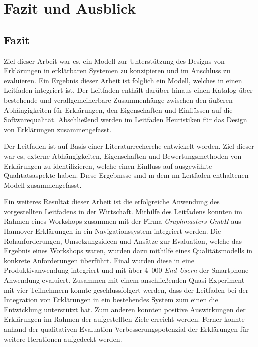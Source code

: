 \chapter{Fazit und Ausblick}

\section{Fazit}

Ziel dieser Arbeit war es, ein Modell zur Unterstützung des Designs von Erklärungen in erklärbaren Systemen zu konzipieren und im Anschluss zu evaluieren. Ein Ergebnis dieser Arbeit ist folglich ein Modell, welches in einen Leitfaden integriert ist. Der Leitfaden enthält darüber hinaus einen Katalog über bestehende und verallgemeinerbare Zusammenhänge zwischen den äußeren Abhängigkeiten für Erklärungen, den Eigenschaften und Einflüssen auf die Softwarequalität. Abschließend werden im Leitfaden Heuristiken für das Design von Erklärungen zusammengefasst.

Der Leitfaden ist auf Basis einer Literaturrecherche entwickelt worden. Ziel dieser war es, externe Abhängigkeiten, Eigenschaften und Bewertungsmethoden von Erklärungen zu identifizieren, welche einen Einfluss auf ausgewählte Qualitätsaspekte haben. Diese Ergebnisse sind in dem im Leitfaden enthaltenen Modell zusammengefasst.

\smallskip

Ein weiteres Resultat dieser Arbeit ist die erfolgreiche Anwendung des vorgestellten Leitfadens in der Wirtschaft. Mithilfe des Leitfadens konnten im Rahmen eines Workshops zusammen mit der Firma \textit{Graphmasters GmbH} aus Hannover Erklärungen in ein Navigationssystem integriert werden. Die Rohanforderungen, Umsetzungsideen und Ansätze zur Evaluation, welche das Ergebnis eines Workshops waren, wurden dazu mithilfe eines Qualitätsmodells in konkrete Anforderungen überführt. Final wurden diese in eine Produktivanwendung integriert und mit über 4~000 \textit{End Usern} der Smartphone-Anwendung evaluiert. Zusammen mit einem anschließenden Quasi-Experiment mit vier Teilnehmern konnte geschlussfolgert werden, dass der Leitfaden bei der Integration von Erklärungen in ein bestehendes System zum einen die Entwicklung unterstützt hat. Zum anderen konnten positive Auswirkungen der Erklärungen im Rahmen der aufgestellten Ziele erreicht werden. Ferner konnte anhand der qualitativen Evaluation Verbesserungspotenzial der Erklärungen für weitere Iterationen aufgedeckt werden.

\smallskip

